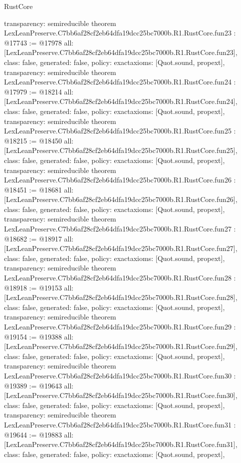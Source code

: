 \begin{lexlean}{RustCore}
\begin{coremodule}
{  transparency: semireducible
}
theorem LexLeanPreserve.C7bb6af28cf2eb64dfa19dcc25bc7000b.R1.RustCore.fun23 : @17743 := @17978 {
  all: [LexLeanPreserve.C7bb6af28cf2eb64dfa19dcc25bc7000b.R1.RustCore.fun23],
  class: false,
  generated: false,
  policy: exact{axioms: [Quot.sound, propext]},
  transparency: semireducible
}
theorem LexLeanPreserve.C7bb6af28cf2eb64dfa19dcc25bc7000b.R1.RustCore.fun24 : @17979 := @18214 {
  all: [LexLeanPreserve.C7bb6af28cf2eb64dfa19dcc25bc7000b.R1.RustCore.fun24],
  class: false,
  generated: false,
  policy: exact{axioms: [Quot.sound, propext]},
  transparency: semireducible
}
theorem LexLeanPreserve.C7bb6af28cf2eb64dfa19dcc25bc7000b.R1.RustCore.fun25 : @18215 := @18450 {
  all: [LexLeanPreserve.C7bb6af28cf2eb64dfa19dcc25bc7000b.R1.RustCore.fun25],
  class: false,
  generated: false,
  policy: exact{axioms: [Quot.sound, propext]},
  transparency: semireducible
}
theorem LexLeanPreserve.C7bb6af28cf2eb64dfa19dcc25bc7000b.R1.RustCore.fun26 : @18451 := @18681 {
  all: [LexLeanPreserve.C7bb6af28cf2eb64dfa19dcc25bc7000b.R1.RustCore.fun26],
  class: false,
  generated: false,
  policy: exact{axioms: [Quot.sound, propext]},
  transparency: semireducible
}
theorem LexLeanPreserve.C7bb6af28cf2eb64dfa19dcc25bc7000b.R1.RustCore.fun27 : @18682 := @18917 {
  all: [LexLeanPreserve.C7bb6af28cf2eb64dfa19dcc25bc7000b.R1.RustCore.fun27],
  class: false,
  generated: false,
  policy: exact{axioms: [Quot.sound, propext]},
  transparency: semireducible
}
theorem LexLeanPreserve.C7bb6af28cf2eb64dfa19dcc25bc7000b.R1.RustCore.fun28 : @18918 := @19153 {
  all: [LexLeanPreserve.C7bb6af28cf2eb64dfa19dcc25bc7000b.R1.RustCore.fun28],
  class: false,
  generated: false,
  policy: exact{axioms: [Quot.sound, propext]},
  transparency: semireducible
}
theorem LexLeanPreserve.C7bb6af28cf2eb64dfa19dcc25bc7000b.R1.RustCore.fun29 : @19154 := @19388 {
  all: [LexLeanPreserve.C7bb6af28cf2eb64dfa19dcc25bc7000b.R1.RustCore.fun29],
  class: false,
  generated: false,
  policy: exact{axioms: [Quot.sound, propext]},
  transparency: semireducible
}
theorem LexLeanPreserve.C7bb6af28cf2eb64dfa19dcc25bc7000b.R1.RustCore.fun30 : @19389 := @19643 {
  all: [LexLeanPreserve.C7bb6af28cf2eb64dfa19dcc25bc7000b.R1.RustCore.fun30],
  class: false,
  generated: false,
  policy: exact{axioms: [Quot.sound, propext]},
  transparency: semireducible
}
theorem LexLeanPreserve.C7bb6af28cf2eb64dfa19dcc25bc7000b.R1.RustCore.fun31 : @19644 := @19883 {
  all: [LexLeanPreserve.C7bb6af28cf2eb64dfa19dcc25bc7000b.R1.RustCore.fun31],
  class: false,
  generated: false,
  policy: exact{axioms: [Quot.sound, propext]},
}
\end{coremodule}
\end{lexlean}

